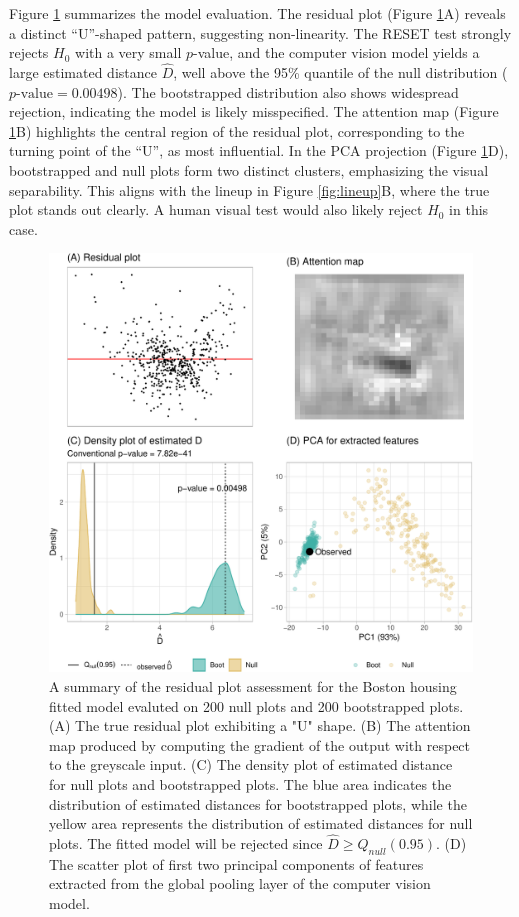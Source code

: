 \documentclass[]{interact}
\theoremstyle{plain}%
\theoremstyle{definition}
\theoremstyle{remark}
\begin{document}
Figure \ref{fig:boston-check} summarizes the model evaluation. The
residual plot (Figure \ref{fig:boston-check}A) reveals a distinct
``U''-shaped pattern, suggesting non-linearity. The RESET test strongly
rejects \(H_0\) with a very small \(p\)-value, and the computer vision
model yields a large estimated distance \(\hat{D}\), well above the 95\%
quantile of the null distribution (\(p\text{-value} = 0.00498\)). The
bootstrapped distribution also shows widespread rejection, indicating
the model is likely misspecified. The attention map (Figure
\ref{fig:boston-check}B) highlights the central region of the residual
plot, corresponding to the turning point of the ``U'', as most
influential. In the PCA projection (Figure \ref{fig:boston-check}D),
bootstrapped and null plots form two distinct clusters, emphasizing the
visual separability. This aligns with the lineup in Figure
\ref{fig:lineup}B, where the true plot stands out clearly. A human
visual test would also likely reject \(H_0\) in this case.

\begin{figure}[!h]

{\centering \includegraphics[width=0.8\linewidth]{paper_files/figure-latex/boston-check-1} 

}

\caption{A summary of the residual plot assessment for the Boston housing fitted model evaluted on 200 null plots and 200 bootstrapped plots. (A) The true residual plot exhibiting a "U" shape. (B) The attention map produced by computing the gradient of the output with respect to the greyscale input.  (C) The density plot of estimated distance for null plots and bootstrapped plots. The blue area indicates the distribution of estimated distances for bootstrapped plots, while the yellow area represents the distribution of estimated distances for null plots. The fitted model will be rejected since $\hat{D} \geq Q_{null}(0.95)$. (D) The scatter plot of first two principal components of features extracted from the global pooling layer of the computer vision model. }\label{fig:boston-check}
\end{figure}
\end{document}
